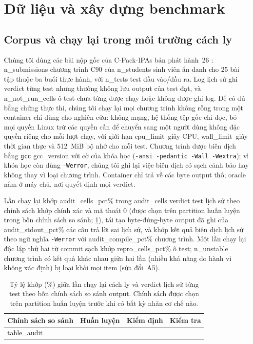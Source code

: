 \section{Dữ liệu và xây dựng benchmark}\label{sec:data}

\subsection{Corpus và chạy lại trong môi trường cách ly}\label{sec:replay}
Chúng tôi dùng các bài nộp gốc của C-Pack-IPAs bản phát hành~26 \citep{orvalho2024cpack}: {{n_submissions}} chương trình C90 của {{n_students}} sinh viên ẩn danh cho 25 bài tập thuộc ba buổi thực hành, với {{n_tests}} test đầu vào/đầu ra. Log lịch sử ghi verdict từng test nhưng thường không lưu output của test đạt, và {{n_not_run_cells}} ô test chưa từng được chạy hoặc không được ghi log. Để có đủ bằng chứng thực thi, chúng tôi chạy lại mọi chương trình không rỗng trong một container chỉ dùng cho nghiên cứu: không mạng, hệ thống tệp gốc chỉ đọc, bỏ mọi quyền Linux trừ các quyền cần để chuyển sang một người dùng không đặc quyền riêng cho mỗi lượt chạy, với giới hạn {{cpu_limit}}~giây CPU, {{wall_limit}}~giây thời gian thực và 512~MiB bộ nhớ cho mỗi test. Chương trình được biên dịch bằng \texttt{gcc} {{gcc_version}} với cờ của khóa học (\texttt{-ansi -pedantic -Wall -Wextra}); vì khóa học còn dùng \texttt{-Werror}, chúng tôi ghi lại việc biên dịch có sạch cảnh báo hay không thay vì loại chương trình. Container chỉ trả về các byte output thô; oracle nằm ở máy chủ, nơi quyết định mọi verdict.

Lần chạy lại khớp {{audit_cells_pct}}\% trong {{audit_cells}} verdict test lịch sử theo chính sách khớp chính xác và mã thoát 0 (được chọn trên partition huấn luyện trong bốn chính sách so sánh; \cref{tab:audit}), tái tạo byte-đúng-byte output đã ghi của {{audit_stdout_pct}}\% các câu trả lời sai lịch sử, và khớp kết quả biên dịch lịch sử theo ngữ nghĩa \texttt{-Werror} với {{audit_compile_pct}}\% chương trình. Một lần chạy lại độc lập thứ hai từ commit sạch khớp {{repro_cells_pct}}\% ô test; {{n_unstable}} chương trình có kết quả khác nhau giữa hai lần (nhiều khả năng do hành vi không xác định) bị loại khỏi mọi item (sửa đổi~A5).

\begin{table}[t]
\centering
\caption{Tỷ lệ khớp (\%) giữa lần chạy lại cách ly và verdict lịch sử từng test theo bốn chính sách so sánh output. Chính sách được chọn trên partition huấn luyện trước khi có bất kỳ nhãn cơ chế nào.}\label{tab:audit}
\small
\begin{tabular}{lrrr}
\toprule
Chính sách so sánh & Huấn luyện & Kiểm định & Kiểm tra \\
\midrule
{{table_audit}}
\bottomrule
\end{tabular}
\end{table}

